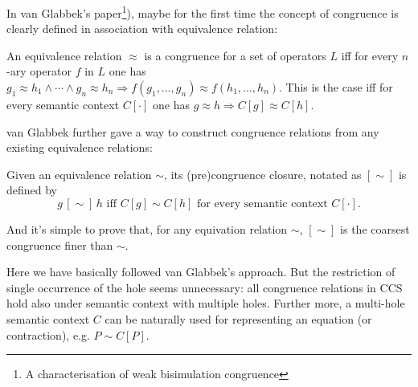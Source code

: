 In van Glabbek's paper\footnote{A characterisation of weak
  bisimulation congruence}), maybe for the first time the concept of
congruence is clearly defined in association with equivalence
relation:
\begin{definition}
An equivalence relation $\approx$ is a congruence for a set of
operators $L$ iff for every $n$-ary operator $f$ in $L$ one has
$g_1\approx h_1 \wedge \cdots \wedge g_n \approx h_n \Rightarrow
f(g_1,\ldots,g_n) \approx f(h_1,\ldots,h_n)$. This is the case iff for
every semantic context $C[\cdot]$ one has $g\approx h \Rightarrow
C[g]\approx C[h]$.
\end{definition}

van Glabbek further gave a way to construct congruence relations from
any existing equivalence relations:
\begin{definition}
Given an equivalence relation $\sim$, its (pre)congruence closure,
notated as $[\sim]$ is defined by
\begin{equation}
g\,[\sim]\, h \mbox{ iff } C[g] \sim C[h] \mbox{ for every semantic
  context } C[\cdot].
\end{equation}
\end{definition}
And it's simple to prove that, for any equivation relation $\sim$,
$[\sim]$ is the coarsest congruence finer than $\sim$.

Here we have basically followed van Glabbek's approach. But the
restriction of single occurrence of the hole seems unnecessary: all
congruence relations in CCS hold also under semantic context with
multiple holes. Further more, a multi-hole semantic context $C$ can be
naturally used for representing an equation (or contraction), e.g. $P
\sim C[P]$.

